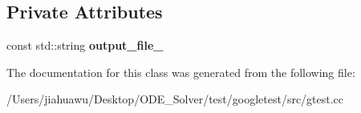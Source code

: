 \subsection*{Private Attributes}
\begin{DoxyCompactItemize}
\item 
\mbox{\label{classtesting_1_1internal_1_1_json_unit_test_result_printer_a0471c1f94083f864b5e4d98fd9e80207}} 
const std\+::string {\bfseries output\+\_\+file\+\_\+}
\end{DoxyCompactItemize}


The documentation for this class was generated from the following file\+:\begin{DoxyCompactItemize}
\item 
/\+Users/jiahuawu/\+Desktop/\+O\+D\+E\+\_\+\+Solver/test/googletest/src/gtest.\+cc\end{DoxyCompactItemize}
